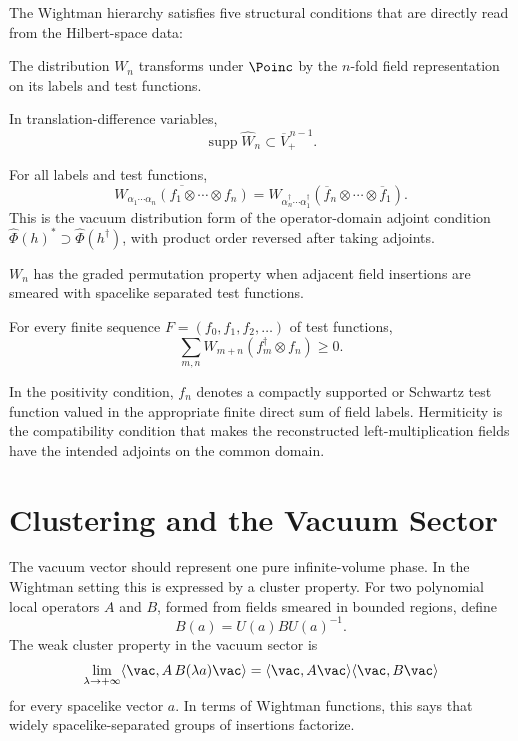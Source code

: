 The Wightman hierarchy satisfies five structural conditions that are directly
read from the Hilbert-space data:
\begin{description}[leftmargin=2.9cm,style=nextline]
\item[Covariance.]
The distribution \(W_n\) transforms under \(\Poinc\) by the
\(n\)-fold field representation on its labels and test functions.
\item[Spectrum.]
In translation-difference variables,
\[
  \operatorname{supp}\widehat W_n\subset \overline V_+^{\,n-1}.
\]
\item[Hermiticity.]
For all labels and test functions,
\[
  \overline{W_{\alpha_1\cdots\alpha_n}
    (f_1\otimes\cdots\otimes f_n)}
  =
  W_{\alpha_n^\dagger\cdots\alpha_1^\dagger}
  (\overline f_n\otimes\cdots\otimes\overline f_1).
\]
This is the vacuum distribution form of the operator-domain adjoint condition
\(\widehat\Phi(h)^*\supset\widehat\Phi(h^\dagger)\), with product order
reversed after taking adjoints.
\item[Locality.]
\(W_n\) has the graded permutation property when adjacent field insertions
are smeared with spacelike separated test functions.
\item[Positivity.]
For every finite sequence \(F=(f_0,f_1,f_2,\ldots)\) of test functions,
\[
  \sum_{m,n} W_{m+n}(f_m^\dagger\otimes f_n)\ge0 .
\]
\end{description}
In the positivity condition, \(f_n\) denotes a compactly supported or Schwartz
test function valued in the appropriate finite direct sum of field labels.
Hermiticity is the compatibility condition that makes the
reconstructed left-multiplication fields have the intended adjoints on the
common domain.

\section{Clustering and the Vacuum Sector}

The vacuum vector should represent one pure infinite-volume phase.  In the
Wightman setting this is expressed by a cluster property.  For two polynomial
local operators \(A\) and \(B\), formed from fields smeared in bounded
regions, define
\[
  B(a)=U(a)BU(a)^{-1}.
\]
The weak cluster property in the vacuum sector is
\begin{equation}
  \lim_{\lambda\to+\infty}
  \langle\vac,A\,B(\lambda a)\vac\rangle
  =
  \langle\vac,A\vac\rangle
  \langle\vac,B\vac\rangle
  \label{eq:wightman-weak-cluster}
\end{equation}
for every spacelike vector \(a\).  In terms of Wightman functions, this says
that widely spacelike-separated groups of insertions factorize.

